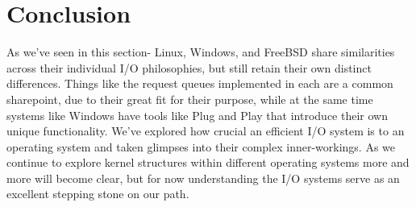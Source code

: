 \documentclass[10pt,draftclsnofoot,onecolumn]{IEEEtran}
\begin{document}
\section{Conclusion}
As we've seen in this section- Linux, Windows, and FreeBSD share similarities across their individual I/O philosophies, but still retain their own distinct differences.
Things like the request queues implemented in each are a common sharepoint, due to their great fit for their purpose, while at the same time systems like Windows have tools like Plug and Play that introduce their own unique functionality.
We've explored how crucial an efficient I/O system is to an operating system and taken glimpses into their complex inner-workings.
As we continue to explore kernel structures within different operating systems more and more will become clear, but for now understanding the I/O systems serve as an excellent stepping stone on our path.

%
%
%



\end{document}
